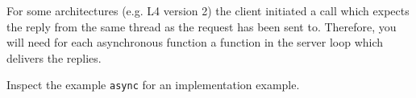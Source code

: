 For some architectures (e.g. L4 version 2) the client initiated a
call which expects the reply from the same thread as the request
has been sent to. Therefore, you will need for each asynchronous function
a function in the server loop which delivers the replies.

Inspect the example \verb|async| for an implementation example.

%
%
